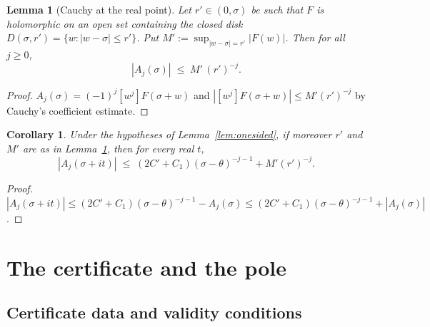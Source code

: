 \documentclass[11pt]{amsart}
\newtheorem{lemma}[theorem]{Lemma}
\newtheorem{corollary}[theorem]{Corollary}
\numberwithin{equation}{section}
\newcommand{\Sig}{\sigma}
\begin{document}
\begin{lemma}[Cauchy at the real point]\label{lem:sigcauchy}
Let $r' \in (0, \Sig)$ be such that $F$ is holomorphic on an open set
containing the closed disk $D(\Sig, r') = \{w : |w - \Sig| \le r'\}$. Put
$M' := \sup_{|w-\Sig| = r'}|F(w)|$. Then for all $j \ge 0$,
\[
|A_j(\Sig)| \;\le\; M' \, (r')^{-j}.
\]
\end{lemma}

\begin{proof}
$A_j(\Sig) = (-1)^j [w^j]F(\Sig + w)$ and
$|[w^j]F(\Sig+w)| \le M' (r')^{-j}$ by Cauchy's coefficient estimate.
\end{proof}

\begin{corollary}\label{cor:upper}
Under the hypotheses of Lemma~\ref{lem:onesided}, if moreover $r'$ and
$M'$ are as in Lemma~\ref{lem:sigcauchy}, then for every real $t$,
\begin{equation}\label{eq:upper}
|A_j(\Sig + it)| \;\le\; (2C' + C_1)(\Sig-\theta)^{-j-1} + M'(r')^{-j}.
\end{equation}
\end{corollary}

\begin{proof}
$|A_j(\Sig+it)| \le (2C'+C_1)(\Sig-\theta)^{-j-1} - A_j(\Sig) \le
(2C'+C_1)(\Sig-\theta)^{-j-1} + |A_j(\Sig)|$.
\end{proof}

\section{The certificate and the pole}\label{sec:certificate}

\subsection{Certificate data and validity conditions}
\end{document}
